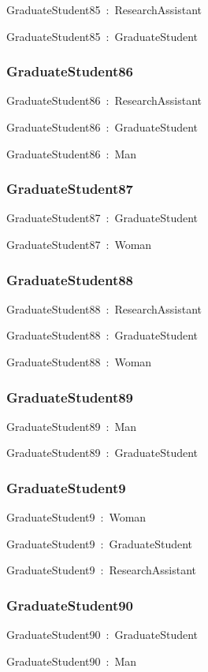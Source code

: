\documentclass{article}
\begin{document}
GraduateStudent85~:~ResearchAssistant

GraduateStudent85~:~GraduateStudent

\subsubsection*{GraduateStudent86}

GraduateStudent86~:~ResearchAssistant

GraduateStudent86~:~GraduateStudent

GraduateStudent86~:~Man

\subsubsection*{GraduateStudent87}

GraduateStudent87~:~GraduateStudent

GraduateStudent87~:~Woman

\subsubsection*{GraduateStudent88}

GraduateStudent88~:~ResearchAssistant

GraduateStudent88~:~GraduateStudent

GraduateStudent88~:~Woman

\subsubsection*{GraduateStudent89}

GraduateStudent89~:~Man

GraduateStudent89~:~GraduateStudent

\subsubsection*{GraduateStudent9}

GraduateStudent9~:~Woman

GraduateStudent9~:~GraduateStudent

GraduateStudent9~:~ResearchAssistant

\subsubsection*{GraduateStudent90}

GraduateStudent90~:~GraduateStudent

GraduateStudent90~:~Man
\end{document}

